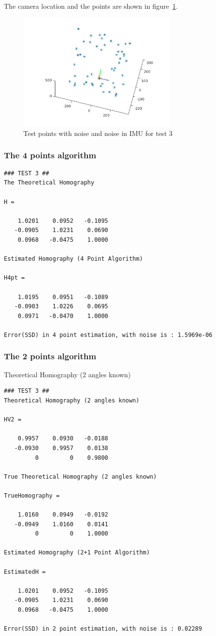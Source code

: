 \documentclass[a4paper,12pt]{article}
\begin{document}
The camera location and the points are shown in figure~\ref{fig:points3}. 

\begin{figure}[tb]
         \centering
         \includegraphics[width=8cm]{Images/points3D-test3.jpg}
         \caption{Test points with noise and noise in IMU for test 3}
 	\label{fig:points3}
\end{figure}
\subsubsection{The 4 points algorithm}
\begin{verbatim}
### TEST 3 ##
The Theoretical Homography

H =

    1.0201    0.0952   -0.1095
   -0.0905    1.0231    0.0690
    0.0968   -0.0475    1.0000

Estimated Homography (4 Point Algorithm)

H4pt =

    1.0195    0.0951   -0.1089
   -0.0903    1.0226    0.0695
    0.0971   -0.0470    1.0000

Error(SSD) in 4 point estimation, with noise is : 1.5969e-06
\end{verbatim}


\subsubsection{The 2 points algorithm}

Theoretical Homography (2 angles known)

\begin{verbatim}
### TEST 3 ##
Theoretical Homography (2 angles known)

HV2 =

    0.9957    0.0930   -0.0188
   -0.0930    0.9957    0.0138
         0         0    0.9800

True Theoretical Homography (2 angles known)

TrueHomography =

    1.0160    0.0949   -0.0192
   -0.0949    1.0160    0.0141
         0         0    1.0000

Estimated Homography (2+1 Point Algorithm)

EstimatedH =

    1.0201    0.0952   -0.1095
   -0.0905    1.0231    0.0690
    0.0968   -0.0475    1.0000

Error(SSD) in 2 point estimation, with noise is : 0.02289
\end{verbatim}


\clearpage
\end{document}
